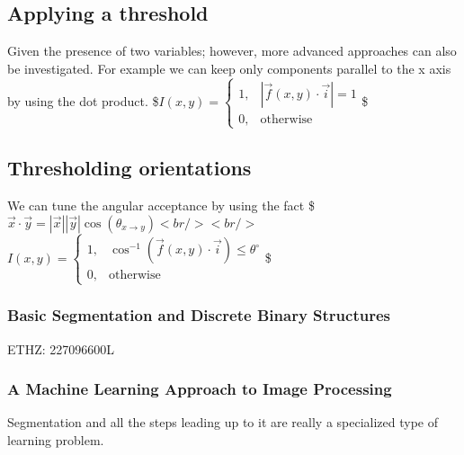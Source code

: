 \documentclass[letterpaper,10pt,english]{sphinxmanual}
\begin{document}
\noindent{}


\subsection{Applying a threshold}
\label{\detokenize{04-BasicSegmentation:applying-a-threshold}}
\sphinxAtStartPar
Given the presence of two variables; however, more advanced approaches can also be investigated. For example we can keep only components parallel to the x axis by using the dot product.
\$\( I(x,y) = 
\begin{cases}
1, & |\vec{f}(x,y)\cdot \vec{i}| = 1 \\
0, & \text{otherwise}
\end{cases}\)\$


\subsection{Thresholding orientations}
\label{\detokenize{04-BasicSegmentation:thresholding-orientations}}
\sphinxAtStartPar
We can tune the angular acceptance by using the fact \$\(\vec{x}\cdot\vec{y}=|\vec{x}| |\vec{y}| \cos(\theta_{x\rightarrow y}) \)\(
<br />
<br />
\)\( I(x,y) = 
\begin{cases}
1, & \cos^{-1}(\vec{f}(x,y)\cdot \vec{i}) \leq \theta^{\circ} \\
0, & \text{otherwise}
\end{cases}\)\$


\subsubsection{Basic Segmentation and Discrete Binary Structures}
\label{\detokenize{04-BasicSegmentation_Part2:basic-segmentation-and-discrete-binary-structures}}\label{\detokenize{04-BasicSegmentation_Part2::doc}}


\sphinxAtStartPar
{} ETHZ: 227\sphinxhyphen{}0966\sphinxhyphen{}00L

\sphinxAtStartPar
{}






\subsubsection{A Machine Learning Approach to Image Processing}
\label{\detokenize{04-BasicSegmentation_Part2:a-machine-learning-approach-to-image-processing}}
\sphinxAtStartPar
Segmentation and all the steps leading up to it are really a specialized type of learning problem.
\end{document}
